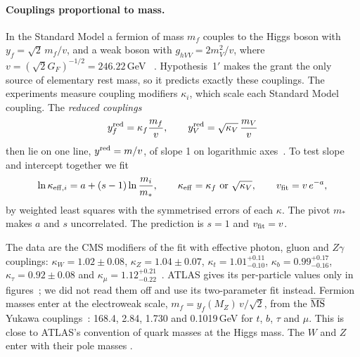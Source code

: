 \paragraph{Couplings proportional to mass.} In the Standard Model a fermion of mass $m_f$ couples to the Higgs boson with $y_f=\sqrt2\,m_f/v$,
and a weak boson with $g_{hVV}=2m_V^2/v$, where $v=(\sqrt2G_F)^{-1/2}=246.22$\,GeV~\cite{mulan2013} \tagP. Hypothesis~1$'$ makes the grant the only
source of elementary rest mass, so it predicts exactly these couplings. The experiments measure coupling modifiers $\kappa_i$, which scale each
Standard Model coupling. The \emph{reduced couplings}
\begin{equation}\label{eq:sm-red}
y_f^{\rm red}=\kappa_f\frac{m_f}{v},\qquad y_V^{\rm red}=\sqrt{\kappa_V}\,\frac{m_V}{v}
\end{equation}
then lie on one line, $y^{\rm red}=m/v$, of slope 1 on logarithmic axes~\cite{atlas2022,cms2022a}. To test slope and intercept together we fit
\begin{equation}\label{eq:sm-fit}
\ln\kappa_{{\rm eff},i}=a+(s-1)\ln\frac{m_i}{m_*},\qquad \kappa_{\rm eff}=\kappa_f\ \text{or}\ \sqrt{\kappa_V},\qquad v_{\rm fit}=v\,e^{-a},
\end{equation}
by weighted least squares with the symmetrised errors of each $\kappa$. The pivot $m_*$ makes $a$ and $s$ uncorrelated. The prediction is $s=1$
and $v_{\rm fit}=v$.

The data are the CMS modifiers of the fit with effective photon, gluon and $Z\gamma$ couplings: $\kappa_W=1.02\pm0.08$, $\kappa_Z=1.04\pm0.07$,
$\kappa_t=1.01^{+0.11}_{-0.10}$, $\kappa_b=0.99^{+0.17}_{-0.16}$, $\kappa_\tau=0.92\pm0.08$ and $\kappa_\mu=1.12^{+0.21}_{-0.22}$~\cite{cms2022a}. ATLAS gives its
per-particle values only in figures~\cite{atlas2022}; we did not read them off and use its two-parameter fit instead. Fermion masses enter at
the electroweak scale, $m_f=y_f(M_Z)\,v/\sqrt2$, from the $\overline{\rm MS}$ Yukawa couplings~\cite{antusch2025}: 168.4, 2.84, 1.730 and 0.1019\,GeV for $t$,
$b$, $\tau$ and $\mu$. This is close to ATLAS's convention of quark masses at the Higgs mass. The $W$ and $Z$ enter with their pole masses
.

